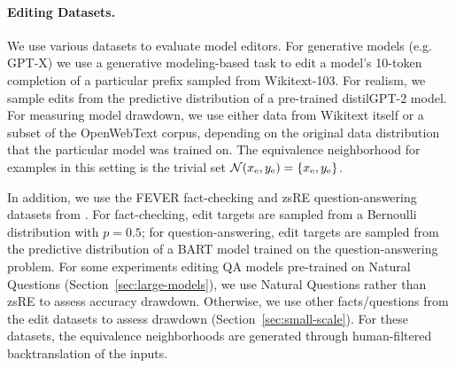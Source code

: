 \documentclass{article}
\begin{document}
\paragraph{Editing Datasets.} We use various datasets to evaluate model editors. For generative models (e.g. GPT-X) we use a generative modeling-based task to edit a model's 10-token completion of a particular prefix sampled from Wikitext-103. For realism, we sample edits from the predictive distribution of a pre-trained distilGPT-2 model.
For measuring model drawdown, we use either data from Wikitext itself or a subset of the OpenWebText \citep{Gokaslan2019OpenWeb} corpus, depending on the original data distribution that the particular model was trained on.
The equivalence neighborhood for examples in this setting is the trivial set $\mathcal{N}(x_\text{e},y_\text{e}) = \{x_\text{e},y_\text{e}\}$.

In addition, we use the FEVER fact-checking and zsRE question-answering datasets from \cite{Cao2021EditingFK}. For fact-checking, edit targets are sampled from a Bernoulli distribution with $p=0.5$; for question-answering, edit targets are sampled from the predictive distribution of a BART model trained on the question-answering problem. For some experiments editing QA models pre-trained on Natural Questions \citep{kwiatkowski2019natural} (Section~\ref{sec:large-models}), we use Natural Questions rather than zsRE to assess accuracy drawdown. Otherwise, we use other facts/questions from the edit datasets to assess drawdown (Section~\ref{sec:small-scale}). For these datasets, the equivalence neighborhoods are generated through human-filtered backtranslation of the inputs.
\end{document}
